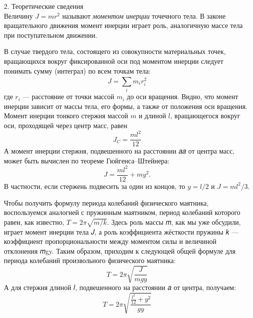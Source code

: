 \documentclass[12pt, a4paper]{article}
\begin{document}
        {\Large 2. Теоретические сведения \\}
        Величину $J = mr^2$ называют \textit{моментом инерции} точечного тела.
        В законе вращательного движения момент инерции играет роль,
        аналогичную массе тела при поступательном движении.

        В случае твердого тела, состоящего из совокупности материальных точек, вращающихся вокруг
        фиксированной оси под моментом инерции следует понимать сумму (интеграл) по всем точкам тела:
        \begin{displaymath}
            J = \sum_{i}^{} m_ir_i^2  
        \end{displaymath}
        где $r_i$ --- расстояние от точки массой $m_i$ до оси вращения. Видно, что момент инерции зависит от массы тела, его формы, а также от положения оси
        вращения. Момент инерции тонкого стержня массой $𝑚$ и длиной $𝑙$, вращающегося вокруг оси,
        проходящей через центр масс, равен
        \begin{displaymath}
            J_C = \frac{ml^2}{12}
        \end{displaymath}
        А момент инерции стержня, подвешенного на расстоянии 𝑎𝑎 от центра масс,
        может быть вычислен по теореме Гюйгенса–Штейнера:
        \begin{equation}
            J = \frac{ml^2}{12} + my^2.
        \end{equation}
        В частности, если стержень подвесить за один из концов, то $y = l/2$ и $J = ml^2/3$.

        Чтобы получить формулу периода колебаний физического маятника,
        воспользуемся аналогией с пружинным маятником, период колебаний которого равен, как известно, $𝑇 = 2\pi\sqrt{𝑚/𝑘}$. Здесь роль массы 𝑚, как мы уже
        обсудили, играет момент инерции тела 𝐽, а роль коэффициента жёсткости
        пружины 𝑘 — коэффициент пропорциональности между моментом силы и
        величиной отклонения 𝑚gy. Таким образом, приходим к следующей общей формуле для периода колебаний произвольного физического маятника:
        \begin{equation}
            T = 2\pi\sqrt{\frac{J}{mgy}}
        \end{equation}
        А для стержня длиной 𝑙, подвешенного на расстоянии 𝑎 от центра, получаем:
        \begin{equation}
            T = 2\pi\sqrt{
                \frac{
                    \frac{l^2}{12} + y^2}
                    {gy}
            }
        \end{equation}
\end{document}
